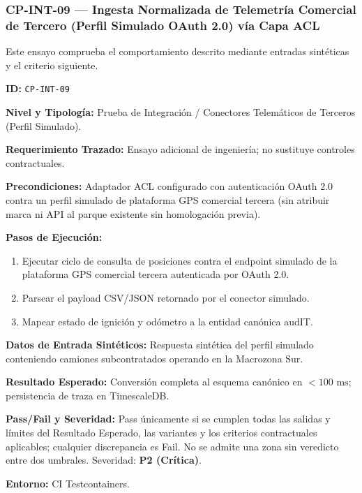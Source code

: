 \subsubsection*{CP-INT-09 — Ingesta Normalizada de Telemetría Comercial de Tercero (Perfil Simulado OAuth 2.0) vía Capa ACL}\label{sec:9-cp-int-09}
Este ensayo comprueba el comportamiento descrito mediante entradas sintéticas y el criterio siguiente.

\par\noindent\textbf{ID:} \texttt{C\allowbreak{}P\allowbreak{}-\allowbreak{}I\allowbreak{}N\allowbreak{}T\allowbreak{}-\allowbreak{}0\allowbreak{}9\allowbreak{}}\par
\par\noindent\textbf{Nivel y Tipología:} Prueba de Integración / Conectores Telemáticos de Terceros (Perfil Simulado).\par
\par\noindent\textbf{Requerimiento Trazado:} Ensayo adicional de ingeniería; no sustituye controles contractuales.\par
\par\noindent\textbf{Precondiciones:} Adaptador ACL configurado con autenticación OAuth 2.0 contra un perfil simulado de plataforma GPS comercial tercera (sin atribuir marca ni API al parque existente sin homologación previa).\par
\par\noindent\textbf{Pasos de Ejecución:} \par
\begin{enumerate}
\item Ejecutar ciclo de consulta de posiciones contra el endpoint simulado de la plataforma GPS comercial tercera autenticada por OAuth 2.0.
\item Parsear el payload CSV/JSON retornado por el conector simulado.
\item Mapear estado de ignición y odómetro a la entidad canónica audIT.
\end{enumerate}
\par\noindent\textbf{Datos de Entrada Sintéticos:} Respuesta sintética del perfil simulado conteniendo camiones subcontratados operando en la Macrozona Sur.\par
\par\noindent\textbf{Resultado Esperado:} Conversión completa al esquema canónico en \(< 100\text{ ms}\); persistencia de traza en TimescaleDB.\par
\par\noindent\textbf{Pass/Fail y Severidad:} Pass únicamente si se cumplen todas las salidas y límites del Resultado Esperado, las variantes y los criterios contractuales aplicables; cualquier discrepancia es Fail. No se admite una zona sin veredicto entre dos umbrales. Severidad: \textbf{P2 (Crítica)}.\par
\par\noindent\textbf{Entorno:} CI Testcontainers.\par






